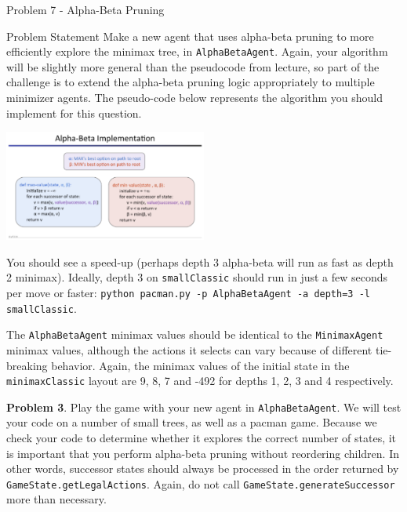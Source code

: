 \begin{problem}{Problem 7 - Alpha-Beta Pruning}
    \begin{statement}{Problem Statement}
        Make a new agent that uses alpha-beta pruning to more efficiently explore the minimax tree, in \texttt{AlphaBetaAgent}. Again, your algorithm will be slightly more general than the pseudocode 
        from lecture, so part of the challenge is to extend the alpha-beta pruning logic appropriately to multiple minimizer agents. The pseudo-code below represents the algorithm you should implement 
        for this question.

        \begin{center}
            \includegraphics[width=0.5\textwidth]{Images/Alpha Beta.png}
        \end{center}
        You should see a speed-up (perhaps depth 3 alpha-beta will run as fast as depth 2 minimax). Ideally, depth 3 on \texttt{smallClassic} should run in just a few seconds per move or faster: 
        \texttt{python pacman.py -p AlphaBetaAgent -a depth=3 -l smallClassic}.

        The \texttt{AlphaBetaAgent} minimax values should be identical to the \texttt{MinimaxAgent} minimax values, although the actions it selects can vary because of different tie-breaking behavior. 
        Again, the minimax values of the initial state in the \texttt{minimaxClassic} layout are 9, 8, 7 and -492 for depths 1, 2, 3 and 4 respectively.

        \begin{center}
            \begin{highlightenv}[15cm]
                \textbf{Problem 3}. Play the game with your new agent in \texttt{AlphaBetaAgent}. We will test your code on a number of small trees, as well as a pacman game. Because we check your code 
                to determine whether it explores the correct number of states, it is important that you perform alpha-beta pruning without reordering children. In other words, successor states should 
                always be processed in the order returned by \texttt{GameState.getLegalActions}. Again, do not call \texttt{GameState.generateSuccessor} more than necessary.
            \end{highlightenv}
        \end{center}


\end{statement}
\end{problem}
